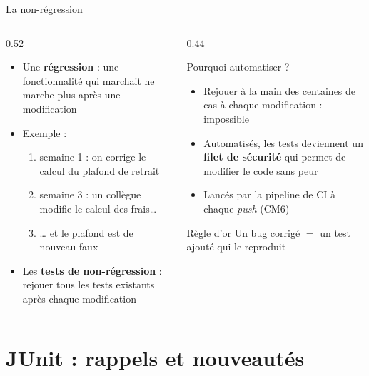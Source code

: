 \documentclass[aspectratio=169,10pt]{beamer}
\begin{document}
\begin{frame}{La non-régression}
  \small
  \begin{columns}[T]
    \begin{column}{0.52\textwidth}
      \begin{itemize}
        \item Une \textbf{régression} : une fonctionnalité qui marchait ne marche plus après une modification
        \item Exemple :
          \begin{enumerate}
            \item semaine 1 : on corrige le calcul du plafond de retrait
            \item semaine 3 : un collègue modifie le calcul des frais\ldots
            \item \ldots{} et le plafond est de nouveau faux
          \end{enumerate}
        \item Les \textbf{tests de non-régression} : rejouer \alert{tous} les tests existants après \alert{chaque} modification
      \end{itemize}
    \end{column}
    \begin{column}{0.44\textwidth}
      \begin{block}{Pourquoi automatiser ?}
        \begin{itemize}
          \item Rejouer à la main des centaines de cas à chaque modification : impossible
          \item Automatisés, les tests deviennent un \textbf{filet de sécurité} qui permet de modifier le code sans peur
          \item Lancés par la pipeline de CI à chaque \textit{push} (CM6)
        \end{itemize}
      \end{block}
      \begin{exampleblock}{Règle d'or}
        Un bug corrigé $=$ un test ajouté qui le reproduit
      \end{exampleblock}
    \end{column}
  \end{columns}
\end{frame}

\section{JUnit : rappels et nouveautés}
\end{document}
